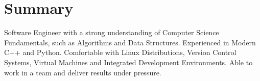 \section{Summary}

\begin{itemize}
    \cventryi
        {Software Engineer with a strong understanding of Computer Science Fundamentals, such as  Algorithms and Data Structures. Experienced in Modern C++ and Python. Comfortable with Linux Distributions, Version Control Systems, Virtual Machines and Integrated Development Environments. Able to work in a team and deliver results under pressure.}
\end{itemize}
